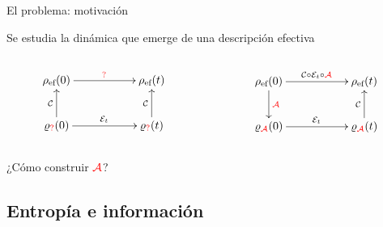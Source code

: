 \begin{frame}{El problema: motivación}
    \begin{center}
        Se estudia la dinámica que emerge de una descripción efectiva\pause
    \end{center}
    \begin{columns}
        \begin{column}{0.5\textwidth}
            \begin{displaymath}
                \xymatrix{
                  {\rho_{\ef}(0)} \ar[rr]^{\text{\textcolor{red}{?}}}
                  && {\rho_{\ef}(t)}\\
                  {\varrho_{\text{\textcolor{red}{?}}}(0)} \ar[rr]^{\mcE_{t}} \ar[u]^{\mcC}
                  && {\varrho_{\text{\textcolor{red}{?}}}(t)} \ar[u]^{\mcC}
                }
              \end{displaymath}
        \end{column}
        \pause
        \begin{column}{0.5\textwidth}
            \begin{displaymath}
                \xymatrix{
                  {\rho_{\ef}(0)} \ar[rr]^{{\mcC\circ\mcE_{t}\circ\color{red}\mcA}} \ar[d]^{{\color{red}\mcA}}
                  && {\rho_{\ef}(t)}\\
                  {\varrho_{{\color{red}\mcA}}(0)} \ar[rr]^{\mcE_{t}}
                  && {\varrho_{{\color{red}\mcA}}(t)} \ar[u]^{\mcC}
                }
              \end{displaymath}
              \pause
        \end{column}
    \end{columns}
    \begin{center}
        ¿Cómo construir ${\color{red}\mathcal{A}}$?
    \end{center}
\end{frame}

\subsection{Entropía e información}

